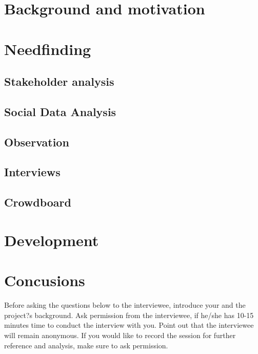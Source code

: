 \documentclass[english]{tktltiki}
\begin{document}
\section{Background and motivation}


\section{Needfinding}
\subsection{Stakeholder analysis}


\subsection{Social Data Analysis}


\subsection{Observation}


\subsection{Interviews}


\subsection{Crowdboard}
\label{sec:crowdboard}


\section{Development}
\label{sec:development}


\section{Concusions}
\label{sec:conclusions}


\pagebreak
\nocite{*}




\lastpage
\appendices
\pagestyle{empty}
\singlespacing

\label{sec:interview-questions}
Before asking the questions below to the interviewee, introduce your and the project?s background. Ask permission from the interviewee, if he/she has 10-15 minutes time to conduct the interview with you. Point out that the interviewee will remain anonymous. If you would like to record the session for further reference and analysis, make sure to ask permission.
\end{document}
